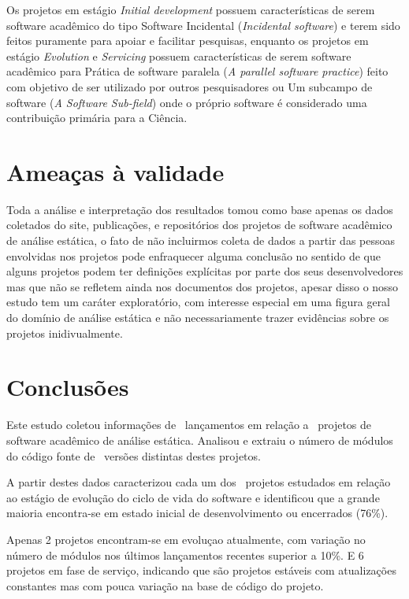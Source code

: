Os projetos em estágio {\it Initial development} possuem características de
serem software acadêmico do tipo Software Incidental ({\it Incidental
software}) e terem sido feitos puramente para apoiar e facilitar pesquisas,
enquanto os projetos em estágio {\it Evolution} e {\it Servicing} possuem
características de serem software acadêmico para Prática de software paralela
({\it A parallel software practice}) feito com objetivo de ser utilizado por
outros pesquisadores ou Um subcampo de software ({\it A Software Sub-field})
onde o próprio software é considerado uma contribuição primária para a Ciência.


\section{Ameaças à validade} %

Toda a análise e interpretação dos resultados tomou como base apenas os dados
coletados do site, publicações, e repositórios dos projetos de software
acadêmico de análise estática, o fato de não incluirmos coleta de dados a
partir das pessoas envolvidas nos projetos pode enfraquecer alguma conclusão no
sentido de que alguns projetos podem ter definições explícitas por parte dos
seus desenvolvedores mas que não se refletem ainda nos documentos dos projetos,
apesar disso o nosso estudo tem um caráter exploratório, com interesse especial em
uma figura geral do domínio de análise estática e não necessariamente trazer
evidências sobre os projetos inidivualmente.


\section{Conclusões} \label{estudo3:conclusoes} %

Este estudo coletou informações de \ReleasesCount \ lançamentos em relação a
\ProjectsWithReleasesCount \ projetos de software acadêmico de análise
estática. Analisou e extraiu o número de módulos do código fonte de
\ReleasesMetricsCount \ versões distintas destes projetos.

A partir destes dados caracterizou cada um dos \SoftwareCount \ projetos
estudados em relação ao estágio de evolução do ciclo de vida do software e
identificou que a grande maioria encontra-se em estado inicial de
desenvolvimento ou encerrados (76\%).

Apenas 2 projetos encontram-se em evoluçao atualmente, com variação no número
de módulos nos últimos lançamentos recentes superior a 10\%. E 6 projetos em
fase de serviço, indicando que são projetos estáveis com atualizações
constantes mas com pouca variação na base de código do projeto.

